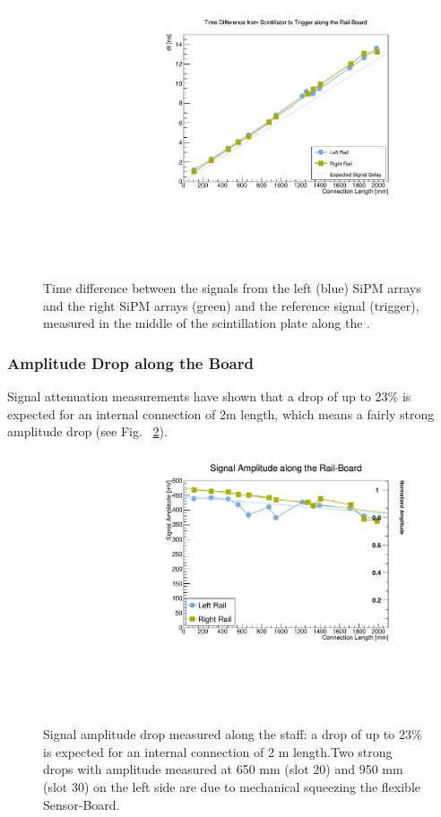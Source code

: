 \documentclass[../BTOF_summary.tex]{subfiles}
\begin{document}
\begin{figure}[h!]
    \centering
    \includegraphics[scale=0.5]{Pictures/TimeDiff_toTrigger.pdf}
    \caption{Time difference between the signals from the left (blue) SiPM arrays and the right SiPM arrays (green) and the reference signal (trigger), measured in the middle of the scintillation plate along the \railboard.}
    \label{fig:DiffTr}
\end{figure}

\subsubsection{Amplitude Drop along the Board}
Signal attenuation measurements have shown that a drop of up to 23\% is expected for an internal connection of 2m length, which means a fairly strong amplitude drop (see Fig. ~\ref{fig:SA}).

\begin{figure}[h!]
    \centering
    \includegraphics[scale=0.5]{Pictures/SignalAmplitude.pdf}
    \caption{Signal amplitude drop measured along the staff: a drop of up to 23\% is expected for an internal connection of 2 m length.Two strong drops with amplitude measured at 650 mm (slot 20) and 950 mm (slot 30) on the left side are due to mechanical squeezing the flexible Sensor-Board.}
    \label{fig:SA}
\end{figure}
\end{document}

